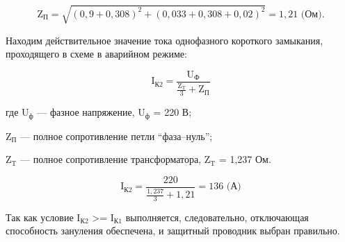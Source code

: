 \begin{equation}
  \text{Z}_\text{П} = \sqrt{(0,9+0,308)^2+(0,033+0,308+0,02)^2} = 1,21 \text{ (Ом)}.
\end{equation}

Находим действительное значение тока однофазного короткого замыкания, проходящего в схеме в аварийном режиме:

\begin{equation}
  \text{I}_\text{К2} = \frac{\text{U}_\text{Ф}}{\frac{\text{Z}_\text{T}}{3}+\text{Z}_\text{П}}
\end{equation}

где \(\text{U}_\text{ф}\) --- фазное напряжение, \(\text{U}_\text{ф}\) = 220 В;

\(\text{Z}_\text{П}\) --- полное сопротивление петли “фаза–нуль”;

\(\text{Z}_\text{T}\) --- полное сопротивление трансформатора, \(\text{Z}_\text{T}\) = 1,237 Ом.

\begin{equation}
  \text{I}_\text{К2} = \frac{220}{\frac{1,237}{3}+1,21} = 136 \text{ (А)}
\end{equation}

Так как условие \(\text{I}_\text{К2}\) >= \(\text{I}_\text{К1}\) выполняется, следовательно, отключающая способность зануления обеспечена, и защитный проводник выбран правильно.

\newpage